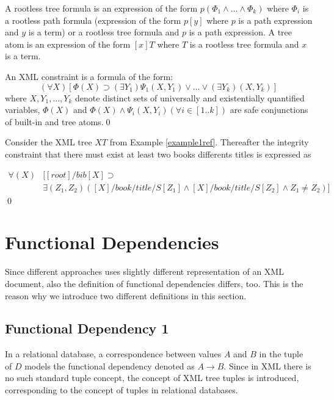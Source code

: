 A rootless tree formula is an expression of the form $p(\Phi_1 \land \dots \land \Phi_k)$ where $\Phi_i$ is a rootless path formula (expression of the form $p[y]$ where $p$ is a path expression and $y$ is a term) or a rootless tree formula and $p$ is a path expression. A tree atom is an expression of the form $[x]T$ where $T$ is a rootless tree formula and $x$ is a term.

\begin{define}\label{integConstr}
An XML constraint is a formula of the form: $$(\forall X)[\Phi(X)\supset (\exists Y_1)\Psi_1(X,Y_1) \lor \dots \lor (\exists Y_k)(X,Y_k)]$$
where $X,Y_1,\dots, Y_k$ denote distinct sets of universally and existentially quantified variables, $\Phi(X)$ and $\Phi(X) \land \Psi_i(X, Y_i) (\forall i \in [1..k])$ are safe conjunctions of built-in and tree atoms.\qed
\end{define}

\begin{example}
Consider the XML tree $XT$ from Example \ref{example1ref}. Thereafter the integrity constraint that there must exist at least two books differents titles is expressed as

\begin{align*}
\forall(X)&[[root]/bib[X] \supset\\
&\exists(Z_1, Z_2)([X]/book/title/S[Z_1] \land [X]/book/title/S[Z_2] \land Z_1 \not = Z_2)]
\end{align*}\qed
\end{example}

\section{Functional Dependencies}

Since different approaches uses slightly different representation of an XML document, also the definition of functional dependencies differs, too. This is the reason why we introduce two different definitions in this section.

\subsection{Functional Dependency 1}

In a relational database, a correspondence between values $A$ and $B$ in the tuple of $D$ models the functional dependency denoted as $A \rightarrow B$. Since in XML there is no such standard tuple concept, the concept of XML tree tuples is introduced, corresponding to the concept of tuples in relational databases.

